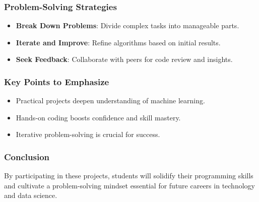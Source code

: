 \documentclass{beamer}
\begin{document}
\begin{frame}
    \frametitle{Problem-Solving Strategies}
    \begin{itemize}
        \item \textbf{Break Down Problems}: Divide complex tasks into manageable parts.
        \item \textbf{Iterate and Improve}: Refine algorithms based on initial results.
        \item \textbf{Seek Feedback}: Collaborate with peers for code review and insights.
    \end{itemize}
\end{frame}

\begin{frame}
    \frametitle{Key Points to Emphasize}
    \begin{itemize}
        \item Practical projects deepen understanding of machine learning.
        \item Hands-on coding boosts confidence and skill mastery.
        \item Iterative problem-solving is crucial for success.
    \end{itemize}
\end{frame}

\begin{frame}
    \frametitle{Conclusion}
    By participating in these projects, students will solidify their programming skills and cultivate a problem-solving mindset essential for future careers in technology and data science.
\end{frame}
\end{document}
